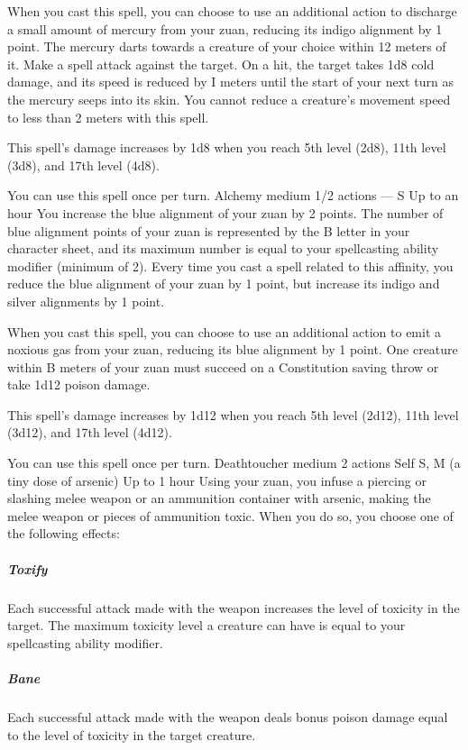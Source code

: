     When you cast this spell, you can choose to use an additional action to discharge a small amount of mercury from your zuan, reducing its indigo alignment by 1 point.
    The mercury darts towards a creature of your choice within 12 meters of it.
    Make a spell attack against the target.
    On a hit, the target takes 1d8 cold damage, and its speed is reduced by I meters until the start of your next turn as the mercury seeps into its skin.
    You cannot reduce a creature's movement speed to less than 2 meters with this spell.

    This spell's damage increases by 1d8 when you reach 5th level (2d8), 11th level (3d8), and 17th level (4d8).

    You can use this spell once per turn.
    {Alchemy medium}
    {1/2 actions}
    {---}
    {S}
    {Up to an hour}
    You increase the blue alignment of your zuan by 2 points.
    The number of blue alignment points of your zuan is represented by the B letter in your character sheet, and its maximum number is equal to your spellcasting ability modifier (minimum of 2).
    Every time you cast a spell related to this affinity, you reduce the blue alignment of your zuan by 1 point, but increase its indigo and silver alignments by 1 point.

    When you cast this spell, you can choose to use an additional action to emit a noxious gas from your zuan, reducing its blue alignment by 1 point.
    One creature within B meters of your zuan must succeed on a Constitution saving throw or take 1d12 poison damage.

    This spell's damage increases by 1d12 when you reach 5th level (2d12), 11th level (3d12), and 17th level (4d12).

    You can use this spell once per turn.
    {Deathtoucher medium}
    {2 actions}
    {Self}
    {S, M (a tiny dose of arsenic)}
    {Up to 1 hour}
    Using your zuan, you infuse a piercing or slashing melee weapon or an ammunition container with arsenic, making the melee weapon or pieces of ammunition toxic.
    When you do so, you choose one of the following effects:
    \subparagraph{Toxify}
    Each successful attack made with the weapon increases the level of toxicity in the target.
    The maximum toxicity level a creature can have is equal to your spellcasting ability modifier.
    \subparagraph{Bane}
    Each successful attack made with the weapon deals bonus poison damage equal to the level of toxicity in the target creature.

